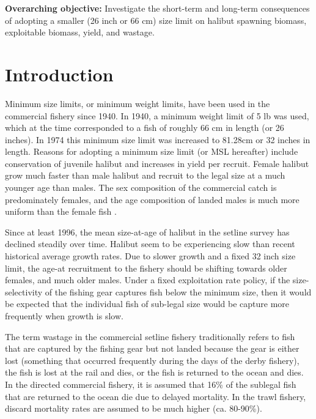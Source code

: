 \textbf{Overarching objective:} Investigate the short-term and long-term consequences of adopting a smaller (26 inch or 66 cm) size limit on halibut spawning biomass, exploitable biomass, yield, and wastage.


\section{Introduction} %
\label{sec:introduction}


Minimum size limits, or minimum weight limits, have been used in the commercial fishery since 1940.  In 1940, a minimum weight limit of 5 lb was used, which at the time corresponded to a fish of roughly 66 cm in length (or 26 inches).  In 1974 this minimum size limit was increased to 81.28cm or 32 inches in length.  Reasons for adopting a minimum size limit (or MSL hereafter) include conservation of juvenile halibut and increases in yield per recruit. Female halibut grow much faster than male halibut and recruit to the legal size at a much younger age than males.  The sex composition of the commercial catch is predominately females, and the age composition of landed males is much more uniform than the female fish \citep{Hare2012Rara}.  

Since at least 1996, the mean size-at-age of halibut in the setline survey has declined steadily over time.  Halibut seem to be experiencing slow than recent historical average growth rates.  Due to slower growth and a fixed 32 inch size limit, the age-at recruitment to the fishery should be shifting towards older females, and much older males.  Under a fixed exploitation rate policy, if the size-selectivity of the fishing gear captures fish below the minimum size, then it would be expected that the individual fish of sub-legal size would be capture more frequently when growth is slow.

The term wastage in the commercial setline fishery traditionally refers to fish that are captured by the fishing gear but not landed because the gear is either lost (something that occurred frequently during the days of the derby fishery), the fish is lost at the rail and dies, or the fish is returned to the ocean and dies.  In the directed commercial fishery, it is assumed that 16\% of the sublegal fish that are returned to the ocean die due to delayed mortality.  In the trawl fishery, discard mortality rates are assumed to be much higher (ca. 80-90\%).  

